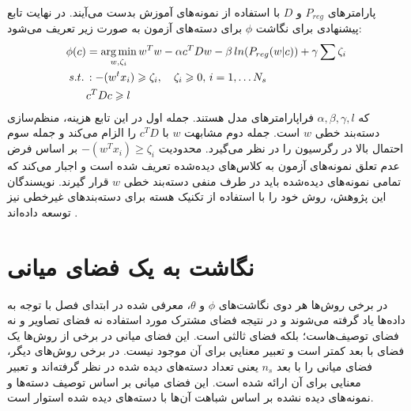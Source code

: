 پارامترهای $P_{reg}$ و $D$ با استفاده از نمونه‌های آموزش بدست می‌آیند.
در نهایت تابع پیشنهادی برای نگاشت $\phi$ برای دسته‌های آزمون به صورت زیر تعریف می‌شود:
\begin{align}
\label{eq:write_a}
\phi(c) &= \operatorname*{arg\,min}_{w,\zeta_i} w^Tw - \alpha c^TDw -\beta \, ln(P_{reg}(w|c)) + \gamma \sum \zeta_i \\
s.t. \, &: -(w^tx_i) \geqslant \zeta_i, \quad \zeta_i \geqslant 0, \, i=1,\ldots N_s  \nonumber \\
& c^TDc \geqslant l \nonumber
\end{align}
که $\alpha, \beta, \gamma, l$ فراپارامترهای مدل هستند. جمله اول در این تابع هزینه، منظم‌سازی دسته‌بند خطی $w$ است. جمله دوم مشابهت $w$ با $c^TD$ را الزام می‌کند و جمله سوم احتمال بالا در رگرسیون را در نظر می‌گیرد. محدودیت $-(w^Tx_i) \geq \zeta_i$ بر اساس فرض عدم تعلق
نمونه‌های آزمون به کلاس‌های دیده‌شده تعریف شده است و اجبار می‌کند که تمامی نمونه‌های دیده‌شده باید در طرف منفی دسته‌بند خطی $w$ قرار گیرند.
نویسندگان این پژوهش، روش خود را با استفاده از تکنیک هسته
برای دسته‌بندهای غیرخطی نیز توسعه داده‌اند \cite{elhoseiny2015}.

\section{نگاشت به یک فضای میانی}
در برخی روش‌ها هر دوی نگاشت‌های $\phi$ و $\theta$، معرفی شده در ابتدای فصل با توجه به داده‌ها یاد گرفته می‌شوند و در نتیجه فضای مشترک مورد استفاده نه فضای تصاویر و نه فضای توصیف‌هاست؛ بلکه فضای ثالثی است. این فضای میانی در برخی از روش‌ها یک فضای با بعد کمتر است و تعبیر معنایی برای آن موجود نیست. در برخی روش‌های دیگر، فضای میانی را با بعد $n_s$ یعنی تعداد دسته‌های دیده شده در نظر گرفته‌اند و تعبیر معنایی برای آن ارائه شده است. این فضای میانی بر اساس توصیف دسته‌ها و نمونه‌های دیده نشده بر اساس شباهت آن‌ها با دسته‌های دیده شده استوار است.

